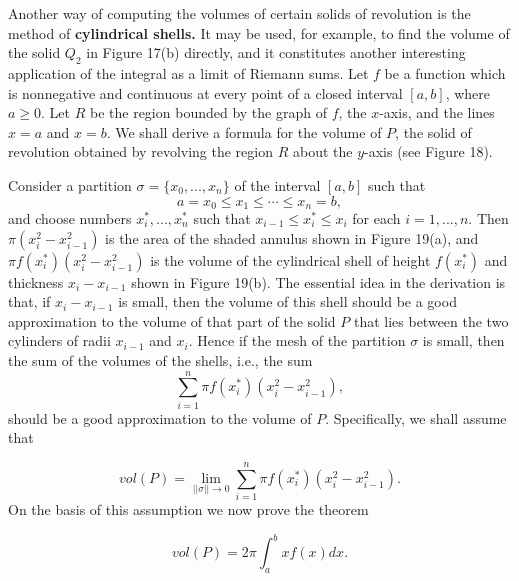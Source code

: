 Another way of computing the volumes of certain solids of revolution is the method of \textbf{cylindrical shells.} It may be used, for example, to find the volume of the solid $Q_2$ in Figure 17(b) directly, and it constitutes another interesting application of the integral as a limit of Riemann sums. Let $f$ be a function which is nonnegative and continuous at every point of a closed interval $[a, b]$, where $a \geq 0$. Let $R$ be the region bounded by the graph of $f$, the $x$-axis, and the lines $x = a$ and $x = b$. We shall derive a formula for the volume of $P$, the solid of revolution obtained by revolving the region $R$ about the $y$-axis (see Figure 18).



Consider a partition $\sigma = \{x_0, ..., x_n \}$ of the interval $[a, b]$ such that
$$
a = x_0 \leq x_1 \leq \cdots \leq x_n = b, 
$$
\noindent and choose numbers $x_i^*,..., x_n^*$ such that $x_{i-1} \leq x_i^* \leq x_i$ for each $i = 1, ... , n$. Then $\pi (x_i^2 -x_{i-1}^2)$ is the area of the shaded annulus shown
in Figure 19(a), and $\pi f(x_i^*)(x_i^2 - x_{i-1}^2)$ is the volume of the cylindrical shell of height $f(x_i^*)$ and thickness $x_i - x_{i-1}$ shown in Figure 19(b). The essential idea in the derivation is that, if $x_i - x_{i-1}$ is small, then the volume of this shell should be a good approximation to the volume of that part of the solid $P$ that lies between the two cylinders of radii $x_{i-1}$ and $x_i$. Hence if the mesh of the partition $\sigma$ is small, then the sum of the volumes of the shells, i.e., the sum
$$
\sum_{i=1}^n \pi f (x_i^*)(x_i^2 - x_{i-1}^2),  
$$
\noindent should be a good approximation to the volume of $P$. Specifically, we shall assume that

\begin{equation}
vol(P) = \lim_{||\sigma|| \rightarrow 0} \sum_{i = 1}^n \pi f(x_i^*)(x_i^2 - x_{i-1}^2).  
\label{eq8.4.1}
\end{equation}
\noindent On the basis of this assumption we now prove the theorem


\begin{theorem} %
$$
vol(P) = 2 \pi \int_a^b x f(x) dx.  
$$
\end{theorem}
 
